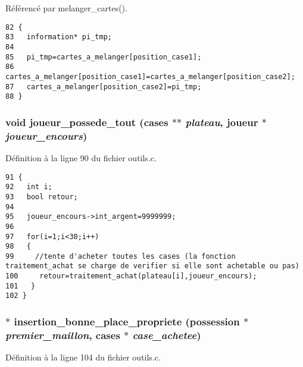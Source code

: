 R\'{e}f\'{e}renc\'{e} par melanger\_\-cartes().

\begin{Code}\begin{verbatim}82 {
83   information* pi_tmp;
84   
85   pi_tmp=cartes_a_melanger[position_case1];
86   cartes_a_melanger[position_case1]=cartes_a_melanger[position_case2];
87   cartes_a_melanger[position_case2]=pi_tmp;
88 }
\end{verbatim}\end{Code}


\subsubsection{\setlength{\rightskip}{0pt plus 5cm}void joueur\_\-possede\_\-tout ({\bf cases} $\ast$$\ast$ {\em plateau}, {\bf joueur} $\ast$ {\em joueur\_\-encours})}\label{outils_8c_39dfce9b2a45da995ceaab0aade1bdf8}




D\'{e}finition \`{a} la ligne 90 du fichier outils.c.

\begin{Code}\begin{verbatim}91 {
92   int i;
93   bool retour;
94   
95   joueur_encours->int_argent=9999999;
96     
97   for(i=1;i<30;i++)
98   {
99     //tente d'acheter toutes les cases (la fonction traitement_achat se charge de verifier si elle sont achetable ou pas)
100     retour=traitement_achat(plateau[i],joueur_encours); 
101   }
102 }
\end{verbatim}\end{Code}


\subsubsection{$\ast$ insertion\_\-bonne\_\-place\_\-propriete ({\bf possession} $\ast$ {\em premier\_\-maillon}, {\bf cases} $\ast$ {\em case\_\-achetee})}\label{outils_8c_d53767c5dbc0daa1a8de086094690eaa}




D\'{e}finition \`{a} la ligne 104 du fichier outils.c.

